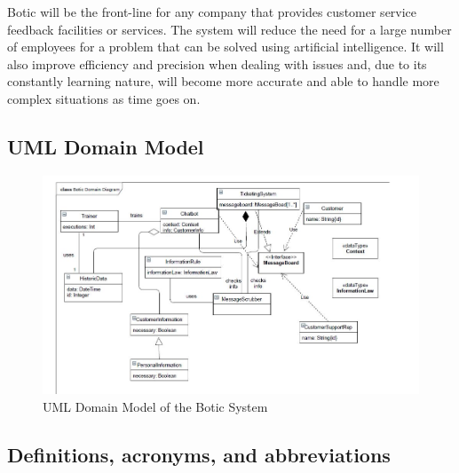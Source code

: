 \documentclass[11pt]{article}
\begin{document}
Botic will be the front-line for any company that provides customer service feedback facilities or services. The system will reduce the need for a large number of employees for a problem that can be solved using artificial intelligence. It will also improve efficiency and precision when dealing with issues and, due to its constantly learning nature, will become more accurate and able to handle more complex situations as time goes on.

\subsection{UML Domain Model}

\begin{figure}[H]
	\centering
 	\includegraphics[width=1.0\textwidth]{../../images/Botic_Domain_Diagram.jpg}
	\caption{UML Domain Model of the Botic System}
\end{figure}

\subsection{Definitions, acronyms, and abbreviations}
\end{document}
